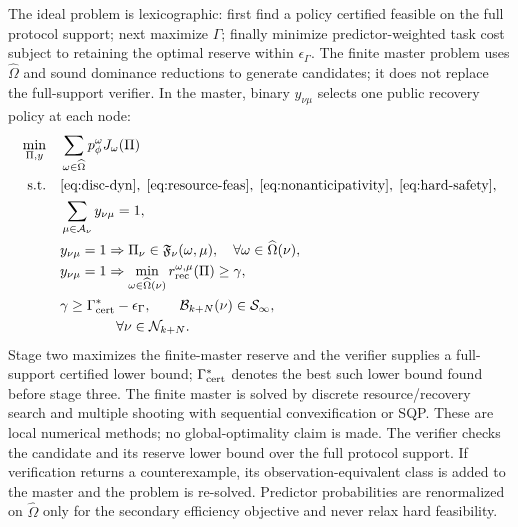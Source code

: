 \documentclass[letterpaper]{article} %
\newcommand{\Sset}{\ensuremath{\mathcal S}}
\begin{document}
The ideal problem is lexicographic: first find a policy certified feasible
on the full protocol support; next maximize $\Gamma$; finally minimize
predictor-weighted task cost subject to retaining the optimal reserve within
$\epsilon_\Gamma$. The finite master problem uses $\widehat\Omega$ and
sound dominance reductions to generate candidates; it does not replace the
full-support verifier. In the master, binary $y_{\nu\mu}$ selects one
public recovery policy at each node:
\begin{align}
\min_{\Pi,y}\quad&\sum_{\omega\in\widehat\Omega}
p_\phi^\omega J_\omega(\Pi)\nonumber\\
\text{s.t.}\quad&\eqref{eq:disc-dyn},\;\eqref{eq:resource-feas},\;
\eqref{eq:nonanticipativity},\;\eqref{eq:hard-safety},\nonumber\\
&\sum_{\mu\in\mathcal A_\nu}y_{\nu\mu}=1,\nonumber\\
&y_{\nu\mu}=1\Rightarrow
\Pi_\nu\in\mathfrak F_\nu(\omega,\mu),
\quad\forall\omega\in\widehat\Omega(\nu),\nonumber\\
&y_{\nu\mu}=1\Rightarrow
\min_{\omega\in\widehat\Omega(\nu)}
r_{\rm rec}^{\omega,\mu}(\Pi)\geq\gamma,\nonumber\\
&\gamma\geq\Gamma_{\rm cert}^*-\epsilon_\Gamma,\qquad
\mathcal B_{k+N}(\nu)\in\Sset_\infty,\nonumber\\
&\hspace{4em}\forall\nu\in\mathcal N_{k+N}.
\label{eq:policy-opt}
\end{align}
Stage two maximizes the finite-master reserve and the verifier supplies a
full-support certified lower bound; $\Gamma_{\rm cert}^*$ denotes the
best such lower bound found before stage three. The finite master is solved
by discrete resource/recovery search and multiple shooting with sequential
convexification or SQP. These are local numerical methods; no
global-optimality claim is made. The verifier checks the candidate and its
reserve lower bound over the full protocol support. If verification
returns a counterexample, its observation-equivalent class is added to the
master and the problem is re-solved. Predictor probabilities are renormalized
on $\widehat\Omega$ only for the secondary efficiency objective and never
relax hard feasibility.
\end{document}

